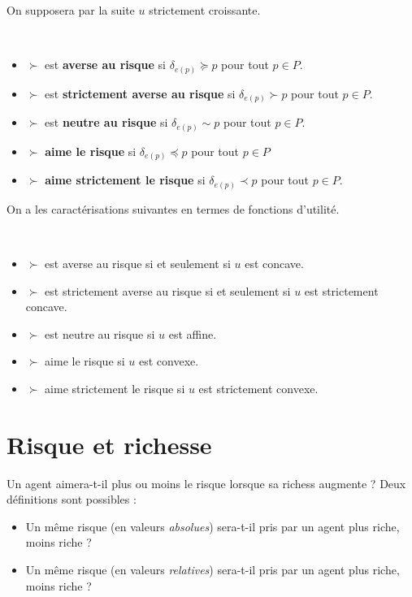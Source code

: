 On supposera par la suite $u$ strictement croissante.

\begin{definition}~
\begin{itemize}
\item[$\bullet$] $\succ$ est {\bf averse au risque} si
$\delta_{e(p)}\succcurlyeq p$ pour tout $p\in P$.%
\item[$\bullet$] $\succ$ est {\bf strictement averse au risque} si
$\delta_{e(p)}\succ p$ pour tout $p\in P$.%
\item[$\bullet$] $\succ$ est {\bf neutre au risque} si
$\delta_{e(p)}\sim p$ pour tout $p\in P$.%
\item[$\bullet$] $\succ$ {\bf aime le risque} si
$\delta_{e(p)}\preccurlyeq p$ pour tout $p\in P$ %
\item[$\bullet$] $\succ$ {\bf aime strictement le risque} si
$\delta_{e(p)}\prec p$ pour tout $p\in P$.
\end{itemize}
\end{definition}
On a les caractérisations suivantes en termes de fonctions
d'utilité.
\begin{proposition}~
\begin{itemize}
\item[$\bullet$] $\succ$ est averse au risque si et seulement si
$u$ est
concave.%
\item[$\bullet$] $\succ$ est strictement averse au risque si et
seulement si
$u$ est strictement concave.%
\item[$\bullet$] $\succ$ est neutre au risque si $u$ est affine. %
\item[$\bullet$] $\succ$ aime le risque si $u$ est convexe. %
\item[$\bullet$] $\succ$ aime strictement le risque si $u$ est
strictement convexe.
\end{itemize}
\end{proposition}

\section{Risque et richesse}
Un agent aimera-t-il plus ou moins le risque lorsque sa richess
augmente ? Deux d\'efinitions sont possibles :
\begin{itemize}
\item Un m\^eme risque (en valeurs {\em absolues}) sera-t-il pris
par un agent plus riche, moins riche ?%
\item Un m\^eme risque (en valeurs {\em relatives}) sera-t-il pris
par un agent plus riche, moins riche ?
\end{itemize}

